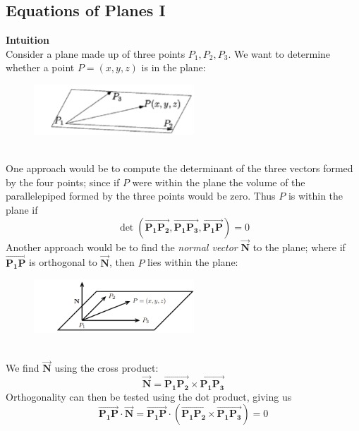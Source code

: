\documentclass{report}
\begin{document}
\subsection{Equations of Planes I} %
\textbf{Intuition}\\
Consider a plane made up of three points $P_1,P_2,P_3$. 
We want to determine whether a point $P=(x,y,z)$ is in the plane:
\begin{figure}[h]
\includegraphics[width=6cm]{Capture77}\\
\centering
\end{figure}\\
One approach would be to compute the determinant of the three vectors formed by the four points;
since if $P$ were within the plane the volume of the parallelepiped formed by the
three points would be zero. Thus $P$ is within the plane if
\begin{equation*}
\det(\overrightarrow{\mathbf{P_1P_2}},\overrightarrow{\mathbf{P_1P_3}},\overrightarrow{\mathbf{P_1P}})=0
\end{equation*}
Another approach would be to find the \textit{normal vector} $\overrightarrow{\mathbf{N}}$ to the plane; 
where if $\overrightarrow{\mathbf{P_1P}}$ is orthogonal to $\overrightarrow{\mathbf{N}}$, then 
$P$ lies within the plane: 
\begin{figure}[h]
\includegraphics[width=6cm]{Capture78}\\
\centering
\end{figure}\\
We find $\overrightarrow{\mathbf{N}}$ using the cross product:
\begin{equation*}
\overrightarrow{\mathbf{N}}=\overrightarrow{\mathbf{P_1P_2}}\times\overrightarrow{\mathbf{P_1P_3}}
\end{equation*}
Orthogonality can then be tested using the dot product, giving us
\begin{equation*}
\overrightarrow{\mathbf{P_1P}}\cdot\overrightarrow{\mathbf{N}}=\overrightarrow{\mathbf{P_1P}}\cdot
(\overrightarrow{\mathbf{P_1P_2}}\times\overrightarrow{\mathbf{P_1P_3}})=0
\end{equation*}
\end{document}
